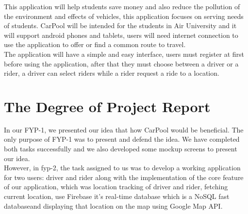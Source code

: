 This application will help students save money and also reduce the pollution of the environment and eﬀects of vehicles, this application focuses on serving needs of students. CarPool will be intended for the students in Air University and it will support android phones and tablets, users will need internet connection to use the application to oﬀer or ﬁnd a common route to travel.\\

The application will have a simple and easy interface, users must register at ﬁrst before using the application, after that they must choose between a driver or a
rider, a driver can select riders while a rider request a ride to a location.

\section{The Degree of Project Report}
In our FYP-1, we presented our idea that how CarPool would be beneficial. The only purpose of FYP-1 was to present and defend the idea. We have completed both tasks successfully and we also developed some mockup screens to present our idea.\\

However, in fyp-2, the task assigned to us was to develop a working application for two users: driver and rider along with the implementation of the core feature of our application, which was location tracking of driver and rider, fetching current location, use Firebase it’s real-time database which is a NoSQL fast databaseand displaying that location on the map using Google Map API.
